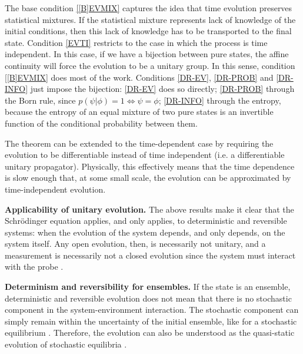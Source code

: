 \documentclass[entropy,article,submit,moreauthors]{Definitions/mdpi}
\begin{document}
The base condition \ref{[B]EVMIX} captures the idea that time evolution preserves statistical mixtures. If the statistical mixture represents lack of knowledge of the initial conditions, then this lack of knowledge has to be transported to the final state. Condition \ref{EVTI} restricts to the case in which the process is time independent. In this case, if we have a bijection between pure states, the affine continuity will force the evolution to be a unitary group. In this sense, condition \ref{[B]EVMIX} does most of the work. Conditions \ref{DR-EV}, \ref{DR-PROB} and \ref{DR-INFO} just impose the bijection: \ref{DR-EV} does so directly; \ref{DR-PROB} through the Born rule, since $p(\psi|\phi) = 1 \iff \psi = \phi$; \ref{DR-INFO} through the entropy, because the entropy of an equal mixture of two pure states is an invertible function of the conditional probability between them.

The theorem can be extended to the time-dependent case by requiring the evolution to be differentiable instead of time independent (i.e. a differentiable unitary propagator). Physically, this effectively means that the time dependence is slow enough that, at some small scale, the evolution can be approximated by time-independent evolution.

\textbf{Applicability of unitary evolution.} The above results make it clear that the Schrödinger equation applies, and only applies, to deterministic and reversible systems: when the evolution of the system depends, and only depends, on the system itself. Any open evolution, then, is necessarily not unitary, and a measurement is necessarily not a closed evolution since the system must interact with the probe \cite{nielsen2010quantum,BreuerPetruccione2002}.

\textbf{Determinism and reversibility for ensembles.} If the state is an ensemble, deterministic and reversible evolution does not mean that there is no stochastic component in the system-environment interaction. The stochastic component can simply remain within the uncertainty of the initial ensemble, like for a stochastic equilibrium \cite{Nelson1966}. Therefore, the evolution can also be understood as the quasi-static evolution of stochastic equilibria \cite{Pavliotis2014,MaesNetocny2014}.

\end{document}
